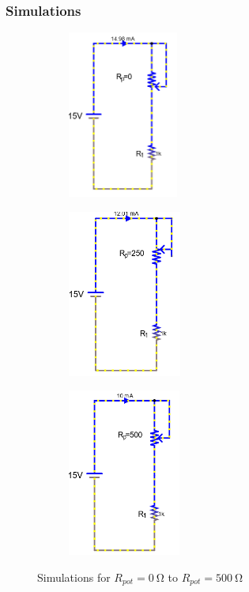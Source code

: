 \documentclass[a4paper]{article}
\begin{document}
\subsubsection{Simulations}
\begin{figure}[H]
    \begin{subfigure}{0.333\textwidth}
        \includegraphics[width=.9\linewidth,height=5.5cm]{pot0}
    \end{subfigure}
    \begin{subfigure}{0.333\textwidth}
        \includegraphics[width=.9\linewidth,height=5.5cm]{pot1}
    \end{subfigure}
    \begin{subfigure}{0.333\textwidth}
        \includegraphics[width=.9\linewidth,height=5.5cm]{pot2}
    \end{subfigure}
    \caption{Simulations for $R_{pot}=\SI{0}{\ohm}$ to $R_{pot}=\SI{500}{\ohm}$}
\end{figure}
\end{document}
